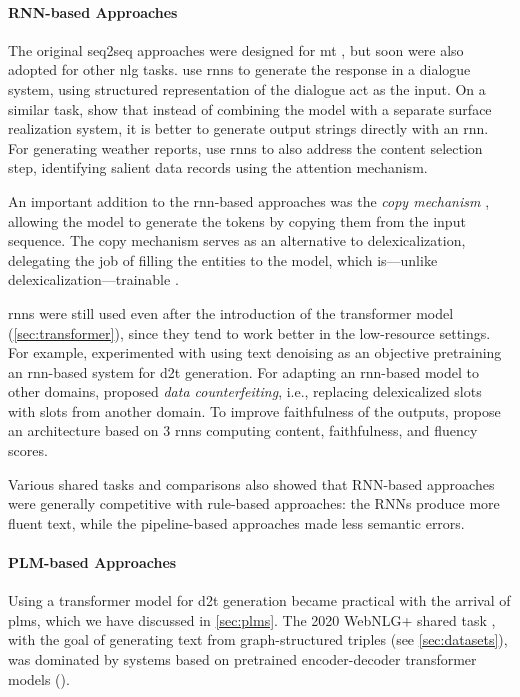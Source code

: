 {\paragraph{RNN-based Approaches} The original seq2seq approaches were designed for \ac{mt} \cite{cho2014learning,sutskever2014sequence}, but soon were also adopted for other \ac{nlg} tasks. \citet{wen2015semantically} use \acp{rnn} to generate the response in a dialogue system, using structured representation of the dialogue act as the input. On a similar task, \citet{dusekSequencetoSequenceGenerationSpoken2016} show that instead of combining the model with a separate surface realization system, it is better to generate output strings directly with an \ac{rnn}. For generating weather reports, \citet{mei2016talk} use \acp{rnn} to also address the content selection step, identifying salient data records using the attention mechanism.

An important addition to the \ac{rnn}-based approaches was the \emph{copy mechanism} \cite{gu2016incorporating,seeGetPointSummarization2017}, allowing the model to generate the tokens by copying them from the input sequence. The copy mechanism serves as an alternative to delexicalization, delegating the job of filling the entities to the model, which is---unlike delexicalization---trainable \cite{gehrmannEndtoEndContentPlan2018}.

\acp{rnn} were still used even after the introduction of the transformer model (\autoref{sec:transformer}), since they tend to work better in the low-resource settings. For example, \citet{freitagUnsupervisedNaturalLanguage2018} experimented with using text denoising as an objective pretraining an \ac{rnn}-based system for \ac{d2t} generation. For adapting an \ac{rnn}-based model to other domains, \citet{wen2020recurrent} proposed \emph{data counterfeiting}, i.e., replacing delexicalized slots with slots from another domain. To improve faithfulness of the outputs, \citet{rebuffel2021controlling} propose an architecture based on 3 \acp{rnn} computing content, faithfulness, and fluency scores.


Various shared tasks and comparisons \cite{gardentWebNLGChallengeGenerating2017,dusekEvaluatingStateoftheartEndtoEnd2020,ferreiraNeuralDatatotextGeneration2019} also showed that RNN-based approaches were generally competitive with rule-based approaches: the RNNs produce more fluent text, while the pipeline-based approaches made less semantic errors.


\paragraph{PLM-based Approaches} Using a transformer model for \ac{d2t} generation became practical with the arrival of \acp{plm}, which we have discussed in \autoref{sec:plms}. The 2020 WebNLG+ shared task \cite{ferreira20202020}, with the goal of generating text from graph-structured triples (see \autoref{sec:datasets}), was dominated by systems based on pretrained encoder-decoder transformer models (\citealp{yang2020improving,agarwalMachineTranslationAided2020,kasnerTrainHardFinetune2020}).

}
